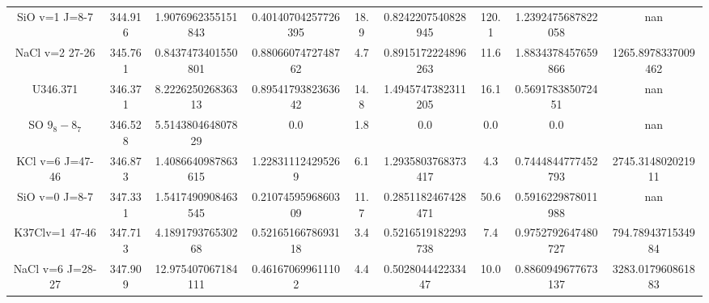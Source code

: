 \begin{table*}[htp]
\begin{tabular}{ccccccccc}
SiO v=1 J=8-7 & 344.916 & 1.9076962355151843 & 0.40140704257726395 & 18.9 & 0.8242207540828945 & 120.1 & 1.2392475687822058 & nan \\
NaCl v=2 27-26 & 345.761 & 0.8437473401550801 & 0.8806607472748762 & 4.7 & 0.8915172224896263 & 11.6 & 1.8834378457659866 & 1265.8978337009462 \\
U346.371 & 346.371 & 8.222625026836313 & 0.8954179382363642 & 14.8 & 1.4945747382311205 & 16.1 & 0.569178385072451 & nan \\
SO $9_8-8_7$ & 346.528 & 5.514380464807829 & 0.0 & 1.8 & 0.0 & 0.0 & 0.0 & nan \\
KCl v=6 J=47-46 & 346.873 & 1.4086640987863615 & 1.228311124295269 & 6.1 & 1.2935803768373417 & 4.3 & 0.7444844777452793 & 2745.314802021911 \\
SiO v=0 J=8-7 & 347.331 & 1.5417490908463545 & 0.2107459596860309 & 11.7 & 0.2851182467428471 & 50.6 & 0.5916229878011988 & nan \\
K37Clv=1 47-46 & 347.713 & 4.189179376530268 & 0.5216516678693118 & 3.4 & 0.5216519182293738 & 7.4 & 0.9752792647480727 & 794.7894371534984 \\
NaCl v=6 J=28-27 & 347.909 & 12.975407067184111 & 0.461670699611102 & 4.4 & 0.502804442233447 & 10.0 & 0.8860949677673137 & 3283.017960861883 \\
\hline
\end{tabular}

\par 
\end{table*}

